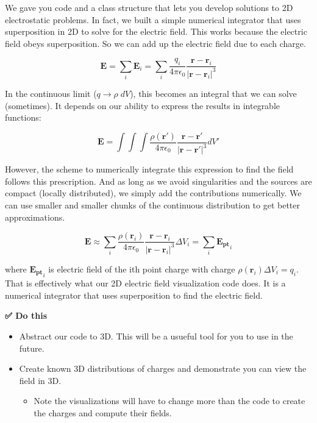 We gave you code and a class structure that lets you develop solutions
to 2D electrostatic problems. In fact, we built a simple numerical
integrator that uses superposition in 2D to solve for the electric
field. This works because the electric field obeys superposition. So we
can add up the electric field due to each charge.

\[\mathbf{E} = \sum_i \mathbf{E}_i = \sum_i \dfrac{q_i}{4\pi\epsilon_0} \dfrac{\mathbf{r} - \mathbf{r}_i}{\left|\mathbf{r} - \mathbf{r}_i\right|^3}\]

In the continuous limit (\(q \rightarrow \rho\;dV\)), this becomes an
integral that we can solve (sometimes). It depends on our ability to
express the results in integrable functions:

\[\mathbf{E} = \int \int \int \dfrac{\rho(\mathbf{r}')}{4\pi\epsilon_0} \dfrac{\mathbf{r} - \mathbf{r}'}{\left|\mathbf{r} - \mathbf{r}'\right|^3} dV'\]

However, the scheme to numerically integrate this expression to find the
field follows this prescription. And as long as we avoid singularities
and the sources are compact (locally distributed), we simply add the
contributions numerically. We can use smaller and smaller chunks of the
continuous distribution to get better approximations.

\[\mathbf{E} \approx \sum_i \dfrac{\rho(\mathbf{r}_i)}{4\pi\epsilon_0} \dfrac{\mathbf{r} - \mathbf{r}_i}{\left|\mathbf{r} - \mathbf{r}_i\right|^3} \Delta V_i  = \sum_i \mathbf{E_{pt}}_i \]

where \(\mathbf{E_{pt}}_i\) is electric field of the ith point charge
with charge \(\rho(\mathbf{r}_i)\Delta V_i = q_i\). That is effectively
what our 2D electric field visualization code does. It is a numerical
integrator that uses superposition to find the electric field.

\textbf{✅ Do this}

\begin{itemize}
\tightlist
\item
  Abstract our code to 3D. This will be a usueful tool for you to use in
  the future.
\item
  Create known 3D distributions of charges and demonstrate you can view
  the field in 3D.

  \begin{itemize}
  \tightlist
  \item
    Note the visualizations will have to change more than the code to
    create the charges and compute their fields.
  \end{itemize}
\end{itemize}

\begin{Shaded}
\begin{Highlighting}[]
\end{Highlighting}
\end{Shaded}
